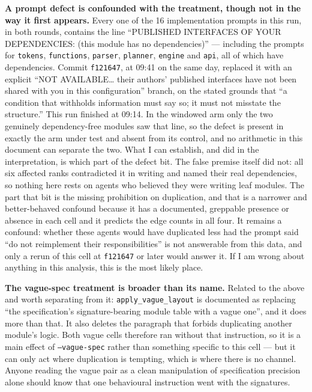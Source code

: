 \documentclass[11pt]{article}
\begin{document}
\textbf{A prompt defect is confounded with the treatment, though not in the way it first
appears.} Every one of the 16 implementation prompts in this run, in both rounds, contains the
line ``PUBLISHED INTERFACES OF YOUR DEPENDENCIES: (this module has no dependencies)'' ---
including the prompts for \texttt{tokens}, \texttt{functions}, \texttt{parser}, \texttt{planner},
\texttt{engine} and \texttt{api}, all of which have dependencies. Commit \texttt{f121647}, at
09:41 on the same day, replaced it with an explicit ``NOT AVAILABLE\ldots{} their authors'
published interfaces have not been shared with you in this configuration'' branch, on the stated
grounds that ``a condition that withholds information must say so; it must not misstate the
structure.'' This run finished at 09:14. In the windowed arm only the two genuinely
dependency-free modules saw that line, so the defect is present in exactly the arm under test and
absent from its control, and no arithmetic in this document can separate the two. What I can
establish, and did in the interpretation, is which part of the defect bit. The false premise
itself did not: all six affected ranks contradicted it in writing and named their real
dependencies, so nothing here rests on agents who believed they were writing leaf modules. The
part that bit is the missing prohibition on duplication, and that is a narrower and better-behaved
confound because it has a documented, greppable presence or absence in each cell and it predicts
the edge counts in all four. It remains a confound: whether these agents would have duplicated
less had the prompt said ``do not reimplement their responsibilities'' is not answerable from this
data, and only a rerun of this cell at \texttt{f121647} or later would answer it. If I am wrong
about anything in this analysis, this is the most likely place.

\textbf{The vague-spec treatment is broader than its name.} Related to the above and worth
separating from it: \texttt{apply\_vague\_layout} is documented as replacing ``the
specification's signature-bearing module table with a vague one'', and it does more than that. It
also deletes the paragraph that forbids duplicating another module's logic. Both vague cells
therefore ran without that instruction, so it is a main effect of \texttt{--vague-spec} rather
than something specific to this cell --- but it can only act where duplication is tempting, which
is where there is no channel. Anyone reading the vague pair as a clean manipulation of
specification precision alone should know that one behavioural instruction went with the
signatures.
\end{document}
